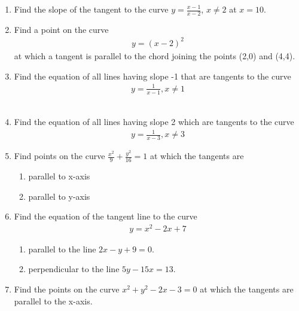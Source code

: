 \begin{enumerate}[label=\thesubsection.\arabic*,ref=\thesubsection.\theenumi]
\item Find the slope of the tangent to the curve $y = \frac{x-1}{x-2}$, $x \neq 2$ at $x=10$.
	\\
\solution 
\label{chapters/12/6/3/2}

\item 
		Find a point on the curve \begin{align}y=(x-2)^2\end{align} at which a tangent is parallel to the chord joining the points (2,0) and (4,4).
			\\
			\solution 
\label{chapters/12/6/3/8}

\item 
Find the equation of all lines having slope  -1 that are tangents to the curve
\begin{align}
y = \frac{1}{x-1}, x \neq 1
\label{chapters/12/6/3/10}
\end{align}
	\\
	\solution 

\item 
Find the equation of all lines having slope 2 which are tangents to the curve 
\begin{align}
y=\frac{1}{x-3}, x\neq{3} 
\end{align}
\solution 
\label{chapters/12/6/3/11}

\item 
 Find points on the curve $\frac{x^2}{9}+\frac{y^2}{16}=1$ at which the tangents are 
 \begin{enumerate}
	 \item parallel to x-axis\\  
	 \item parallel to y-axis
 \end{enumerate}
 \solution 
\label{chapters/12/6/3/13}

\item 
Find the equation of the tangent line to the curve
\begin{align}
y=x^2-2x+7
\end{align}
\begin{enumerate}
    \item parallel to the line $2x-y+9=0$.
    \item perpendicular to the line $5y-15x=13$.
\end{enumerate}
\solution
\label{chapters/12/6/3/15}

\item Find the points on the curve $x^2+y^2-2x-3=0$ at which the tangents are parallel to the x-axis.

\end{enumerate}
